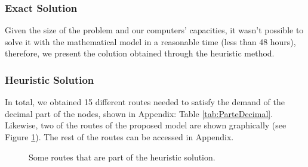 \documentclass{amsart}
\begin{document}
            \subsubsection{Exact Solution}
            Given the size of the problem and our computers' capacities, it wasn't possible to solve it with the mathematical model in a reasonable time (less than 48 hours), therefore, we present the colution obtained through the heuristic method.
            
            \subsubsection{Heuristic Solution}
            In total, we obtained 15 different routes needed to satisfy the demand of the decimal part of the nodes, shown in Appendix: Table \ref{tab:ParteDecimal}. Likewise, two of the routes of the proposed model are shown graphically (see Figure \ref{fig:RutasDeEjemplo}). The rest of the routes can be accessed in Appendix.

        \begin{figure}[h!]
            \begin{center}
                \caption{Some routes that are part of the heuristic solution.}
                \label{fig:RutasDeEjemplo}
            \end{center}
        \end{figure}
            
\end{document}
